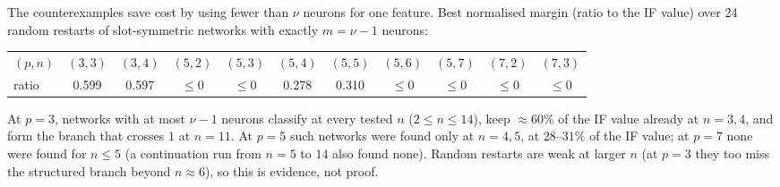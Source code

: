 The counterexamples save cost by using fewer than $\nu$ neurons for one feature.  Best normalised margin (ratio
to the IF value) over 24 random restarts of slot-symmetric networks with exactly $m=\nu-1$ neurons:
\begin{center}
\begin{tabular}{lcccccccccc}
\toprule
$(p,n)$ & $(3,3)$ & $(3,4)$ & $(5,2)$ & $(5,3)$ & $(5,4)$ & $(5,5)$ & $(5,6)$ & $(5,7)$ & $(7,2)$ & $(7,3)$\\
ratio & 0.599 & 0.597 & $\le0$ & $\le0$ & 0.278 & 0.310 & $\le0$ & $\le0$ & $\le0$ & $\le0$\\
\bottomrule
\end{tabular}
\end{center}
At $p=3$, networks with at most $\nu-1$ neurons classify at every tested $n$ ($2\le n\le14$), keep $\approx60\%$ of the
IF value already at $n=3,4$, and form the branch that crosses $1$ at $n=11$.  At $p=5$ such networks were found only at
$n=4,5$, at $28$--$31\%$ of the IF value; at $p=7$ none were found for $n\le5$ (a continuation run from $n=5$ to $14$
also found none).  Random restarts are weak at larger $n$ (at $p=3$ they too miss the structured branch beyond $n\approx6$),
so this is evidence, not proof.
